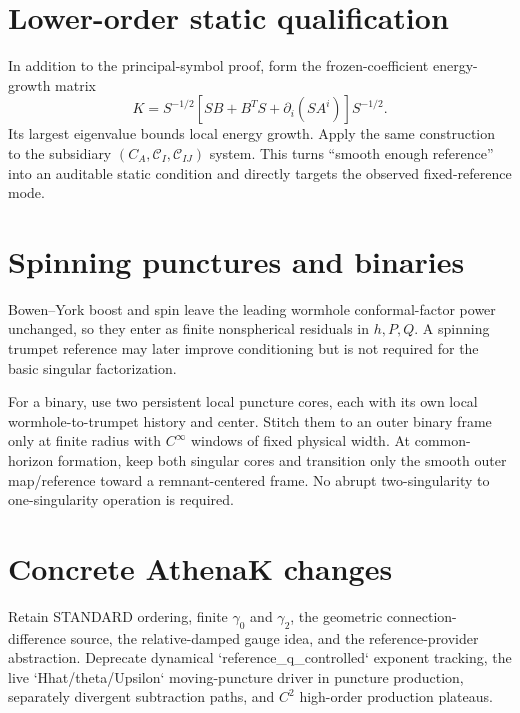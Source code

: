 \documentclass[11pt]{article}
\newcommand{\cC}{\mathcal C}
\begin{document}
\section{Lower-order static qualification}
In addition to the principal-symbol proof, form the frozen-coefficient energy-growth matrix
\begin{equation}
K=S^{-1/2}\left[SB+B^TS+\partial_i(SA^i)\right]S^{-1/2}.
\label{eq:lowergate}
\end{equation}
Its largest eigenvalue bounds local energy growth. Apply the same construction to the subsidiary $(C_A,\cC_I,\cC_{IJ})$ system. This turns ``smooth enough reference'' into an auditable static condition and directly targets the observed fixed-reference mode.

\section{Spinning punctures and binaries}
Bowen--York boost and spin leave the leading wormhole conformal-factor power unchanged, so they enter as finite nonspherical residuals in $h,P,Q$. A spinning trumpet reference may later improve conditioning but is not required for the basic singular factorization.

For a binary, use two persistent local puncture cores, each with its own local wormhole-to-trumpet history and center. Stitch them to an outer binary frame only at finite radius with $C^\infty$ windows of fixed physical width. At common-horizon formation, keep both singular cores and transition only the smooth outer map/reference toward a remnant-centered frame. No abrupt two-singularity to one-singularity operation is required.

\section{Concrete AthenaK changes}
Retain STANDARD ordering, finite $\gamma_0$ and $\gamma_2$, the geometric connection-difference source, the relative-damped gauge idea, and the reference-provider abstraction. Deprecate dynamical `reference_q_controlled` exponent tracking, the live `Hhat/theta/Upsilon` moving-puncture driver in puncture production, separately divergent subtraction paths, and $C^2$ high-order production plateaus.
\end{document}
